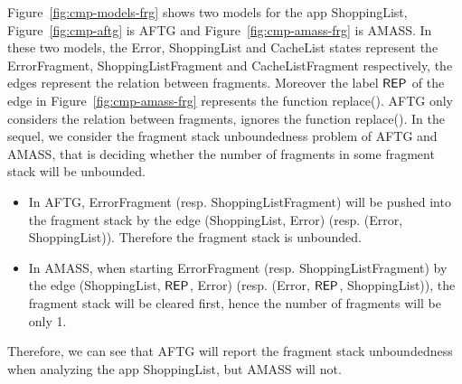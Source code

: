 Figure~\ref{fig:cmp-models-frg} shows two models for the app ShoppingList, Figure~\ref{fig:cmp-aftg} is AFTG and Figure~\ref{fig:cmp-amass-frg} is AMASS. 
In these two models, the Error, ShoppingList and CacheList states represent the ErrorFragment, ShoppingListFragment and CacheListFragment respectively, the edges represent the relation between fragments. Moreover the label $\mathsf{REP}$ of the edge in Figure~\ref{fig:cmp-amass-frg} represents the function replace(). 
AFTG only considers the relation between fragments, ignores the function replace(). In the sequel, we consider the fragment stack unboundedness problem of AFTG and AMASS, that is deciding whether the number of fragments in some fragment stack will be unbounded.
\begin{itemize}
	\item In AFTG, ErrorFragment (resp. ShoppingListFragment) will be pushed into the fragment stack by the edge (ShoppingList, Error) (resp. (Error, ShoppingList)). Therefore the fragment stack is unbounded.
	\item In AMASS, when starting ErrorFragment (resp. ShoppingListFragment) by the edge (ShoppingList, $\mathsf{REP}$, Error) (resp. (Error, $\mathsf{REP}$, ShoppingList)), the fragment stack will be cleared first, hence the number of fragments will be only 1.
\end{itemize}
Therefore, we can see that AFTG will report the fragment stack unboundedness when analyzing the app ShoppingList, but AMASS will not.
